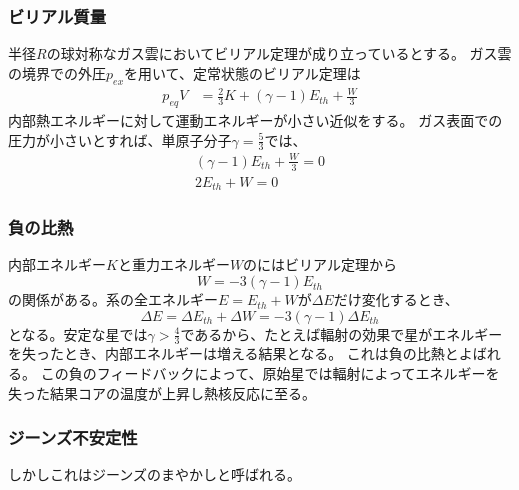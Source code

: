 \documentclass{jsarticle}
\newcommand{\ethe}{E_{th}}
\newcommand{\beq}{\begin{equation}}
\newcommand{\eeq}{\end{equation}}
\begin{document}
\subsubsection{ビリアル質量}
半径$R$の球対称なガス雲においてビリアル定理が成り立っているとする。
ガス雲の境界での外圧$p_{ex}$を用いて、定常状態のビリアル定理は
\begin{align}
    p_{eq}V &= \frac{2}{3}K + (\gamma -1)E_{th} + \frac{W}{3}
\end{align}
内部熱エネルギーに対して運動エネルギーが小さい近似をする。
ガス表面での圧力が小さいとすれば、単原子分子$\gamma = \frac{5}{3}$では、
\begin{align}
    (\gamma -1)E_{th} + \frac{W}{3} = 0\label{eq:easyvirial}\\
    2E_{th} + W = 0
\end{align}
\subsubsection{負の比熱}
内部エネルギー$K$と重力エネルギー$W$のにはビリアル定理から
\beq
W = - 3(\gamma -1) \ethe
\eeq
の関係がある。系の全エネルギー$E = \ethe + W$が$\Delta E$だけ変化するとき、
\beq
    \Delta E = \Delta \ethe + \Delta W = -  3(\gamma -1)\Delta \ethe
\eeq
となる。安定な星では$\gamma > \frac{4}{3}$であるから、たとえば輻射の効果で星がエネルギーを失ったとき、内部エネルギーは増える結果となる。
これは負の比熱とよばれる。
この負のフィードバックによって、原始星では輻射によってエネルギーを失った結果コアの温度が上昇し熱核反応に至る。
\subsubsection{ジーンズ不安定性}
しかしこれはジーンズのまやかしと呼ばれる。
\end{document}
